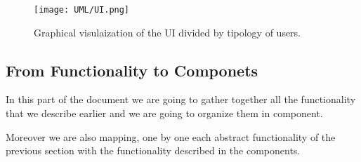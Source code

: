 \documentclass[11pt]{article} %
\begin{document}
\begin{figure}[H]
	\centering
	\texttt{[image: UML/UI.png]}
	\caption{Graphical visulaization of the UI divided by tipology of users.}
\end{figure}	


\subsection{From Functionality to Componets}

In this part of the document we are going to gather together all the functionality that we describe earlier and we are going to organize them in component.

Moreover we are also mapping, one by one each abstract functionality of the previous section with the functionality described in the components.
\end{document}
